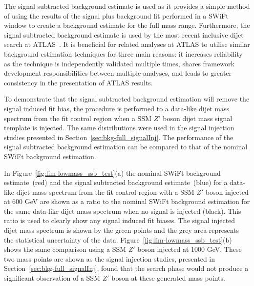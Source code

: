 The signal subtracted background estimate is used as it provides a simple method of using the results of the signal plus background fit
performed in a SWiFt window to create a background estimate for the full mass range. 
Furthermore, the signal subtracted background estimate is used by the most recent inclusive dijet search at ATLAS~\cite{dijet-mori17_paper}.
It is beneficial for related analyses at ATLAS to utilise similar background estimation techniques for three main reasons:
it increases reliability as the technique is independently validated multiple times,
shares framework development responsibilities between multiple analyses,
and leads to greater consistency in the presentation of ATLAS results.

To demonstrate that the signal subtracted background estimation will remove the signal induced fit bias,
the procedure is performed to a data-like dijet mass spectrum from the fit control region when a SSM $Z'$ boson dijet mass signal template is injected.
The same distributions were used in the signal injection studies presented in Section~\ref{sec:bkg-full_signalInj}.
The performance of the signal subtracted background estimation can be compared to that of the nominal SWiFt background estimation.

In Figure~\ref{fig:lim-lowmass_ssb_test}(a) the nominal SWiFt background estimate~(red) and the signal subtracted background estimate~(blue)
for a data-like dijet mass spectrum from the fit control region with a SSM $Z'$ boson injected at 600 GeV are
shown as a ratio to the nominal SWiFt background estimation for the same data-like dijet mass spectrum when no signal is injected (black).
This ratio is used to clearly show any signal induced fit biases.
The signal injected dijet mass spectrum is shown by the green points and the grey area represents the statistical uncertainty of the data.
Figure~\ref{fig:lim-lowmass_ssb_test}(b) shows the same comparison using a SSM $Z'$ boson injected at 1000 GeV.
These two mass points are shown as the signal injection studies, presented in Section~\ref{sec:bkg-full_signalInj},
found that the search phase would not produce a significant observation of a SSM $Z'$ boson at these generated mass points. 

